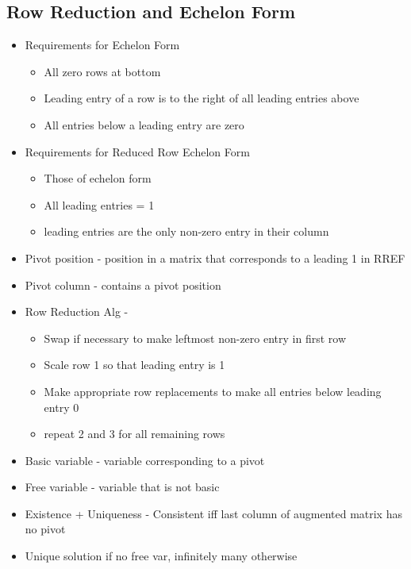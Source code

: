\documentclass{article}
\begin{document}
\subsection{Row Reduction and Echelon Form}
\begin{itemize}
    \item Requirements for Echelon Form 
    \begin{itemize}
        \item All zero rows at bottom 
        \item Leading entry of a row is to the right of all leading entries above
        \item All entries below a leading entry are zero
    \end{itemize}
    \item Requirements for Reduced Row Echelon Form
    \begin{itemize}
        \item Those of echelon form 
        \item All leading entries = 1
        \item leading entries are the only non-zero entry in their column
    \end{itemize}
    \item Pivot position - position in a matrix that corresponds to a leading 1 in RREF
    \item Pivot column - contains a pivot position
    \item Row Reduction Alg - 
    \begin{itemize}
        \item Swap if necessary to make leftmost non-zero entry in first row
        \item Scale row 1 so that leading entry is 1
        \item Make appropriate row replacements to make all entries below leading entry 0
        \item repeat 2 and 3 for all remaining rows 
    \end{itemize}
    \item Basic variable - variable corresponding to a pivot 
    \item Free variable - variable that is not basic 
    \item Existence + Uniqueness - Consistent iff last column of augmented matrix has no pivot
    \item Unique solution if no free var, infinitely many otherwise
\end{itemize}
\end{document}

